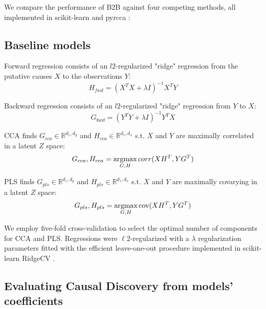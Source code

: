 We compare the performance of B2B against four competing methods, all
implemented in scikit-learn \citep{sklearn} and pyrcca \citep{bilenko2016pyrcca}:
%

\subsection{Baseline models}

Forward regression consists of an $l2$-regularized "ridge" regression from the
putative causes $X$ to the observations $Y$: \begin{equation} H_{fwd} = (X^T X
+\lambda I)^{-1} X^T Y \end{equation}

Backward regression consists of an $l2$-regularized "ridge" regression from $Y$
to $X$: \begin{equation} G_{bwd} = (Y^T Y +\lambda I)^{-1} Y^T X \end{equation}

CCA finds $G_{cca}\in\mathbb{R}^{d_z, d_y}$ and $H_{cca}\in\mathbb{R}^{d_z, d_x}$
s.t.
$X$ and $Y$ are maximally correlated in a latent $Z$ space:
\begin{equation} G_{cca},H_{cca} = \operatorname*{argmax}_{G,H} corr(XH^T, YG^T) \end{equation}

PLS finds $G_{pls}\in\mathbb{R}^{d_z, d_y}$ and $H_{pls}\in\mathbb{R}^{d_z, d_x}$
s.t.
$X$ and $Y$ are maximally covarying in a latent $Z$ space:
\begin{equation} G_{pls},H_{pls} = \operatorname*{argmax}_{G,H} \text{cov}(XH^T, YG^T) \end{equation}

We employ five-fold cross-validation to select the optimal number of components
for CCA and PLS. Regressions were $\ell2$-regularized with a $\lambda$ regularization
parameters fitted with the efficient leave-one-out procedure implemented in
scikit-learn RidgeCV \citep{sklearn}.

\subsection{Evaluating Causal Discovery from models' coefficients}

